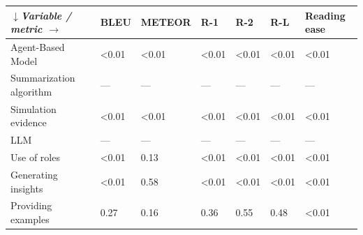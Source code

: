 \begin{tabular}{|l|l|l|l|l|l|l|}
\hline
\textit{$\downarrow$Variable / metric $\rightarrow$} & BLEU & METEOR & R-1 & R-2 & R-L & Reading ease \\
 \hline
 Agent-Based Model & \textless{}0.01 & \textless{}0.01 & \textless{}0.01 & \textless{}0.01 & \textless{}0.01 & \textless{}0.01 \\
 \hline
 Summarization algorithm & — & — & — & — & — & — \\
 \hline
 Simulation evidence & \textless{}0.01 & \textless{}0.01 & \textless{}0.01 & \textless{}0.01 & \textless{}0.01 & \textless{}0.01 \\
 \hline
 LLM & — & — & — & — & — & — \\
 \hline
 Use of roles & \textless{}0.01 & 0.13 & \textless{}0.01 & \textless{}0.01 & \textless{}0.01 & \textless{}0.01 \\
 \hline
 Generating insights & \textless{}0.01 & 0.58 & \textless{}0.01 & \textless{}0.01 & \textless{}0.01 & \textless{}0.01 \\
 \hline
 Providing examples & 0.27 & 0.16 & 0.36 & 0.55 & 0.48 & \textless{}0.01 \\
\hline
\end{tabular}
